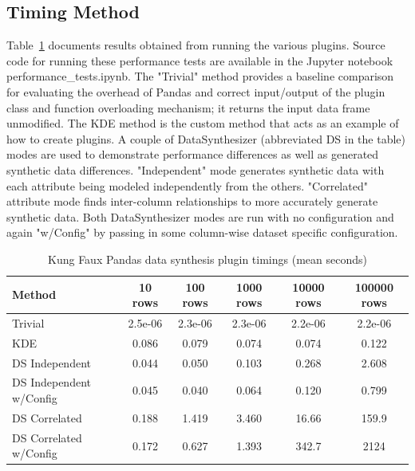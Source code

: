 \documentclass{amia}
\begin{document}
\subsection{Timing Method}

Table~\ref{timing_results} documents results obtained from running the various plugins. Source code for running these performance tests are available in the Jupyter notebook performance\_tests.ipynb. The "Trivial" method provides a baseline comparison for evaluating the overhead of Pandas and correct input/output of the plugin class and function overloading mechanism; it returns the input data frame unmodified. The KDE method is the custom method that acts as an example of how to create plugins. A couple of DataSynthesizer (abbreviated DS in the table) modes are used to demonstrate performance differences as well as generated synthetic data differences. "Independent" mode generates synthetic data with each attribute being modeled independently from the others. "Correlated" attribute mode finds inter-column relationships to more accurately generate synthetic data. Both DataSynthesizer modes are run with no configuration and again "w/Config" by passing in some column-wise dataset specific configuration.

\begin{table}
	\caption{Kung Faux Pandas data synthesis plugin timings (mean seconds)}
	\label{timing_results}
	\centering
	\begin{tabular}{l c c c c c}
		\toprule 
		Method & 10 rows & 100 rows & 1000 rows & 10000 rows & 100000 rows\\ 
		\midrule 
		Trivial & 2.5e-06 & 2.3e-06 & 2.3e-06 & 2.2e-06 & 2.2e-06 \\ 
		KDE & 0.086 & 0.079 & 0.074 & 0.074 & 0.122 \\ 
		DS Independent & 0.044 & 0.050 & 0.103 & 0.268 & 2.608 \\ 
		DS Independent w/Config & 0.045 & 0.040 & 0.064 & 0.120 & 0.799 \\
		DS Correlated & 0.188 & 1.419 & 3.460 & 16.66 & 159.9 \\ 
		DS Correlated w/Config & 0.172 & 0.627 & 1.393 & 342.7 & 2124 \\ 
		\midrule
	\end{tabular}
\end{table}
\end{document}
